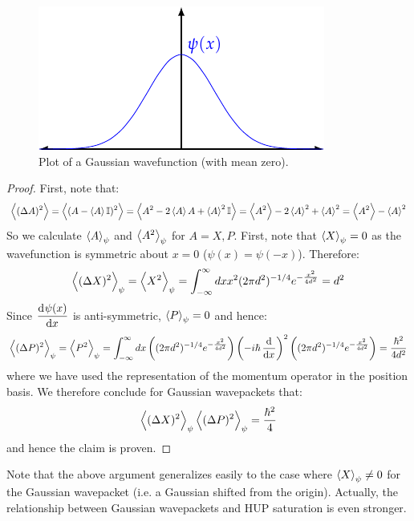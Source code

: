 \begin{figure}[htbp]
    \centering
    \includegraphics[]{Images/fig-Gaussian.pdf}
    \caption{Plot of a Gaussian wavefunction (with mean zero).}
    \label{fig-Gaussian}
\end{figure}
\begin{proof}
    First, note that:
    \begin{equation}
        \left< (\Delta A)^2 \right> = \left< (A - \left< A \right>\mathbb{I})^2 \right> = \left< A^2 - 2\left< A \right>A + \left< A \right>^2\mathbb{I} \right> = \left< A^2 \right> - 2\left< A \right>^2 + \left< A \right>^2 = \left< A^2 \right> - \left< A \right>^2
    \end{equation}
    So we calculate $\left< A \right>_\psi$ and $\left< A^2 \right>_\psi$ for $A = X, P$. First, note that $\left< X \right>_\psi = 0$ as the wavefunction is symmetric about $x = 0$ ($\psi(x) = \psi(-x)$). Therefore:
    \begin{equation}
        \left< (\Delta X)^2 \right>_\psi = \left< X^2 \right>_\psi = \int_{-\infty}^\infty dx x^2(2\pi d^2)^{-1/4}e^{-\frac{x^2}{4d^2}} = d^2
    \end{equation}
    Since $\dod{\psi(x)}{x}$ is anti-symmetric, $\left< P \right>_\psi = 0$ and hence:
    \begin{equation}
        \avg{(\Delta P)^2}_\psi = \avg{P^2}_\psi = \int_{-\infty}^\infty dx\left((2\pi d^2)^{-1/4}e^{-\frac{x^2}{4d^2}}\right)\left(-i\hbar\dod{}{x}\right)^2\left((2\pi d^2)^{-1/4}e^{-\frac{x^2}{4d^2}}\right) = \frac{\hbar^2}{4d^2}
    \end{equation}
    where we have used the representation of the momentum operator in the position basis. We therefore conclude for Gaussian wavepackets that:
    \begin{equation}
        \left< (\Delta X)^2 \right>_\psi \left< (\Delta P)^2 \right>_\psi = \frac{\hbar^2}{4}
    \end{equation}
    and hence the claim is proven.
\end{proof}

Note that the above argument generalizes easily to the case where $\left< X \right>_\psi \neq 0$ for the Gaussian wavepacket (i.e. a Gaussian shifted from the origin).
Actually, the relationship between Gaussian wavepackets and HUP saturation is even stronger.

